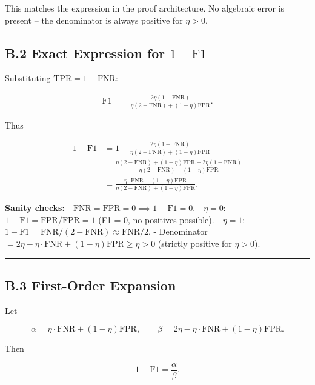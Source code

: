 \documentclass[
  12pt,
]{article}
\begin{document}
This matches the expression in the proof architecture. No algebraic
error is present -- the denominator is always positive for \(\eta > 0\).

\subsection{\texorpdfstring{B.2 Exact Expression for
\(1 - \text{F1}\)}{B.2 Exact Expression for 1 - \textbackslash text\{F1\}}}\label{b.2-exact-expression-for-1---textf1}

Substituting \(\text{TPR} = 1 - \text{FNR}\):

\[
\begin{aligned}
\text{F1} &= \frac{2\eta(1-\text{FNR})}
{\eta(2-\text{FNR}) + (1-\eta)\text{FPR}}.
\end{aligned}
\]

Thus

\[
\begin{aligned}
1 - \text{F1} &= 1 - \frac{2\eta(1-\text{FNR})}
{\eta(2-\text{FNR}) + (1-\eta)\text{FPR}} \\
&= \frac{\eta(2-\text{FNR}) + (1-\eta)\text{FPR} - 2\eta(1-\text{FNR})}
{\eta(2-\text{FNR}) + (1-\eta)\text{FPR}} \\
&= \frac{\eta\cdot\text{FNR} + (1-\eta)\text{FPR}}
{\eta(2-\text{FNR}) + (1-\eta)\text{FPR}}.
\end{aligned}
\]

\textbf{Sanity checks:} -
\(\text{FNR} = \text{FPR} = 0 \implies 1-\text{F1} = 0\). -
\(\eta = 0\): \(1-\text{F1} = \text{FPR}/\text{FPR} = 1\) (F1 = 0, no
positives possible). - \(\eta = 1\):
\(1-\text{F1} = \text{FNR}/(2-\text{FNR}) \approx \text{FNR}/2\). -
Denominator
\(= 2\eta - \eta\cdot\text{FNR} + (1-\eta)\text{FPR} \geq \eta > 0\)
(strictly positive for \(\eta > 0\)).

\begin{center}\rule{0.5\linewidth}{0.5pt}\end{center}

\subsection{B.3 First-Order Expansion}\label{b.3-first-order-expansion}

Let

\[\alpha = \eta\cdot\text{FNR} + (1-\eta)\text{FPR}, \qquad
\beta = 2\eta - \eta\cdot\text{FNR} + (1-\eta)\text{FPR}.\]

Then

\[1 - \text{F1} = \frac{\alpha}{\beta}.\]
\end{document}
